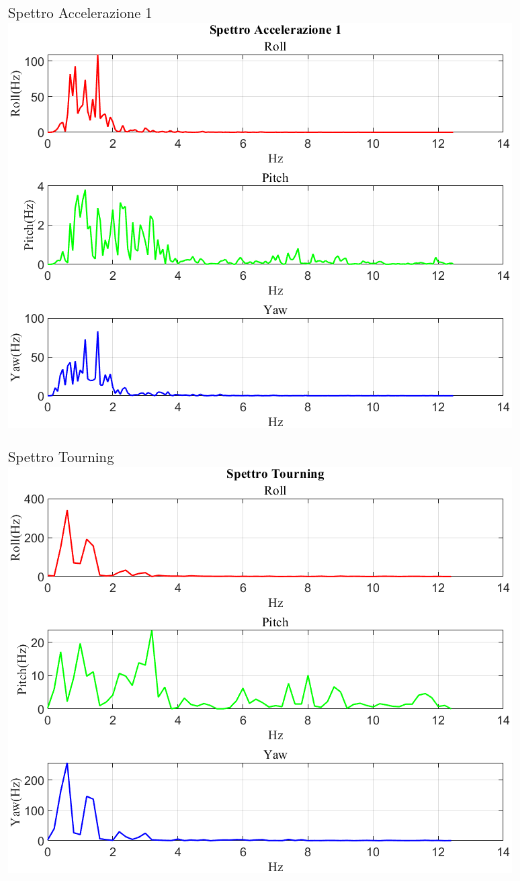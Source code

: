 \documentclass[beamer]{standalone}
\begin{document}
	\begin{frame}{{Spettro Accelerazione 1}}
		\centering\includegraphics[height=.8\textheight]{figure/VAng/Trasformata/Spettro Accelerazione 1}
	\end{frame}
	
	\begin{frame}{{Spettro Tourning}}
		\centering\includegraphics[height=.8\textheight]{figure/VAng/Trasformata/Spettro Tourning}
	\end{frame}
	
\end{document}

